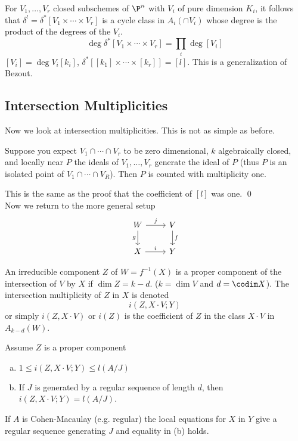 For $V_1,\ldots,V_r$ closed subschemes of $\P^n$ with $V_i$ of pure dimension $K_i$, it follows that $\delta^!=\delta^*[V_1\times \cdots \times V_r]$ is a cycle class in $A_i(\cap V_i)$ whose degree is the product of the degrees of the $V_i$. 
	\[
	\deg \delta^*[V_1\times \cdots \times V_r]=\prod_i \deg [V_i]
	\]
$[V_i]=\deg V_i[k_i]$, $\delta^*[[k_1] \times \cdots \times [k_r]]=[l]$. This is a generalization of Bezout.




\subsection{Intersection Multiplicities}




Now we look at intersection multiplicities. This is not as simple as before.

\begin{prop}
Suppose you expect $V_1 \cap \cdots \cap V_r$ to be zero dimensional, $k$ algebraically closed, and locally near $P$ the ideals of $V_1,\ldots,V_r$ generate the ideal of $P$ (thus $P$ is an isolated point of $V_1 \cap \cdots \cap V_R$). Then $P$ is counted with multiplicity one.  
\end{prop}

\pf This is the same as the proof that the coefficient of $[l]$ was one. \qed \\

Now we return to the more general setup
	\[
	\begin{tikzcd}
	W \arrow{r}{j} \arrow[swap]{d}{g} & V \arrow{d}{f} \\
	X \arrow{r}{i} & Y
	\end{tikzcd}
	\]

\begin{dfn}
An irreducible component $Z$ of $W=f^{-1}(X)$ is a proper component of the intersection of $V$ by $X$ if $\dim Z=k-d$. ($k=\dim V$ and $d=\codim X$). The intersection multiplicity of $Z$ in $X$ is denoted 
	\[
	i(Z, X \cdot V; Y)
	\]
or simply $i(Z, X \cdot V)$ or $i(Z)$ is the coefficient of $Z$ in the class $X \cdot V$ in $A_{k-d}(W)$. 
\end{dfn}


\begin{prop}
Assume $Z$ is a proper component 
\begin{enumerate}[(a)]
\item $1 \leq i(Z,X \cdot V; Y) \leq l(A/J)$
\item If $J$ is generated by a regular sequence of length $d$, then $i(Z,X \cdot V; Y)=l(A/J)$.
\end{enumerate}
 If $A$ is Cohen-Macaulay (e.g. regular) the local equations for $X$ in $Y$ give a regular sequence generating $J$ and equality in (b) holds.
\end{prop}

